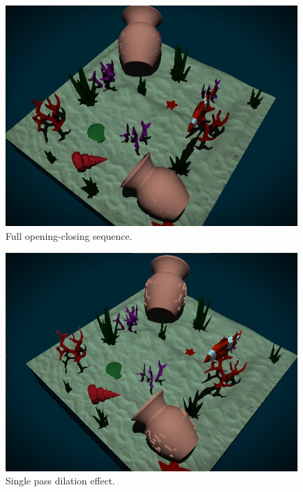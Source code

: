 \documentclass{article}
\begin{document}
\begin{figure}[h]
    \vspace{1cm}
    \centering
    \includegraphics[width=\columnwidth]{imgs/opening_closing.jpg}
    \caption{Full opening-closing sequence.}
    \label{fig:opening_closing_ms}
\end{figure}

\vspace{5em}

\begin{figure}[h]
    \centering
    \includegraphics[width=\columnwidth]{imgs/dilation.jpg}
    \caption{Single pass dilation effect.}
    \label{fig:dilation_ms}
\end{figure}
\end{document}

